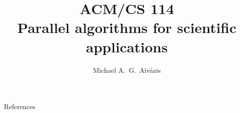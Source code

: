 \documentclass{beamer}
\title[ACM/CS 114]{ACM/CS 114 \\ Parallel algorithms for scientific applications}
\author{Michael A.~G.~A\"iv\'azis}
\institute{California Institute of Technology}
\begin{document}
\begin{frame}
  \titlepage
\end{frame}





\begin{frame}{References}


\end{frame}
\end{document}
